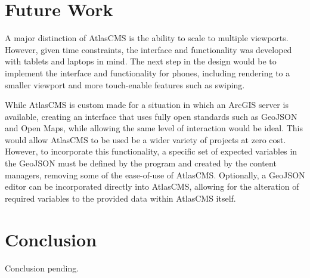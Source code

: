 \documentclass[11pt, draftcls, conference, onecolumn]{IEEEtran}
\begin{document}
\section{Future Work}
A major distinction of AtlasCMS is the ability to scale to multiple viewports. However, given time constraints, the interface and functionality was developed with tablets and laptops in mind. The next step in the design would be to implement the interface and functionality for phones, including rendering to a smaller viewport and more touch-enable features such as swiping.

While AtlasCMS is custom made for a situation in which an ArcGIS server is available, creating an interface that uses fully open standards such as GeoJSON and Open Maps, while allowing the same level of interaction would be ideal. This would allow AtlasCMS to be used be a wider variety of projects at zero cost. However, to incorporate this functionality, a specific set of expected variables in the GeoJSON must be defined by the program and created by the content managers, removing some of the ease-of-use of AtlasCMS. Optionally, a GeoJSON editor can be incorporated directly into AtlasCMS, allowing for the alteration of required variables to the provided data within AtlasCMS itself.

\section{Conclusion}
Conclusion pending.



\end{document}
